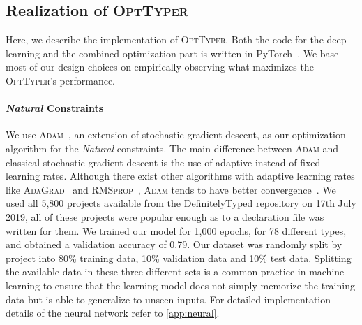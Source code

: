 \documentclass[sigplan,10pt,review,anonymous]{acmart} %
\newcommand{\projectname}{\textsc{OptTyper}\xspace}
\theoremstyle{plain}
\theoremstyle{remark}
\theoremstyle{definition}
\begin{document}
\subsection{Realization of \projectname{}}\label{ssec:combprodts}

Here, we describe the implementation of \projectname. Both the code for the deep
learning and the combined optimization part is written in
PyTorch~\cite{paszke2017}. We base most of our design choices on empirically
observing what maximizes the \projectname's performance.

\paragraph{\textit{Natural} Constraints} We use \textsc{Adam}~\cite{kingma2014}, an extension of stochastic gradient descent,
as our optimization algorithm for the \textit{Natural} constraints.
%
The main difference between \textsc{Adam} and classical stochastic gradient descent
is the use of adaptive instead of fixed learning rates.
%
Although there exist other algorithms with adaptive learning rates
like \textsc{AdaGrad}~\cite{duchi2011} and \textsc{RMSprop}~\cite{tieleman2014},
\textsc{Adam} tends to have better convergence~\cite{ruder2016}.
We used all 5,800 projects available from the DefinitelyTyped repository on 17th July 2019, all of these projects were popular enough as to a declaration file was written for them.
%
We trained our model for 1,000 epochs, for 78 different types,
and obtained a validation accuracy of 0.79.
%
%
Our dataset was randomly split by project into 80\% training data,
10\% validation data and 10\% test data.
%
Splitting the available data in these three different sets is a common practice in machine learning
to ensure that the learning model does not simply memorize the training data
but is able to generalize to unseen inputs. For detailed implementation details of the neural network refer to \cref{app:neural}.
\end{document}
